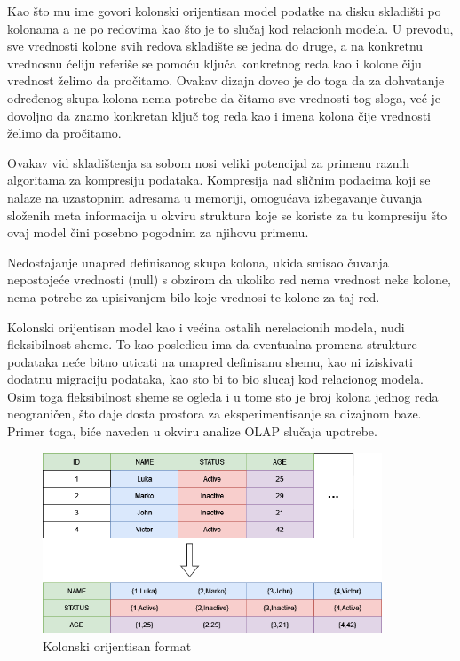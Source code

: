 \documentclass[12pt,oneside]{memoir}
\begin{document}
Kao što mu ime govori kolonski orijentisan model podatke na disku skladišti po kolonama a ne po redovima kao što je to slučaj kod relacionh modela. U prevodu, sve vrednosti kolone svih redova skladište se jedna do druge, a na konkretnu vrednosnu ćeliju referiše se pomoću ključa konkretnog reda kao i kolone čiju vrednost želimo da pročitamo. Ovakav dizajn doveo je do toga da za dohvatanje određenog skupa kolona nema potrebe da čitamo sve vrednosti tog sloga, već je dovoljno da znamo konkretan ključ tog reda kao i imena kolona čije vrednosti želimo da pročitamo.

Ovakav vid skladištenja sa sobom nosi veliki potencijal za primenu raznih algoritama za kompresiju podataka.  Kompresija nad sličnim podacima koji se nalaze na uzastopnim adresama u memoriji, omogućava izbegavanje čuvanja složenih meta informacija u okviru struktura koje se koriste za tu kompresiju što ovaj model čini posebno pogodnim za njihovu primenu.

Nedostajanje unapred definisanog skupa kolona, ukida smisao čuvanja nepostojeće vrednosti (null) s obzirom da ukoliko  red nema vrednost neke kolone, nema potrebe za upisivanjem bilo koje vrednosi te kolone za taj red.

Kolonski orijentisan model kao i većina ostalih nerelacionih modela, nudi fleksibilnost sheme. To kao posledicu ima da eventualna promena strukture podataka neće bitno uticati na unapred definisanu shemu, kao ni iziskivati dodatnu migraciju podataka, kao sto bi to bio slucaj kod relacionog modela. Osim toga fleksibilnost sheme se ogleda i u tome sto je broj kolona jednog reda neograničen, što daje dosta prostora za eksperimentisanje sa dizajnom baze. Primer toga, biće naveden u okviru analize OLAP slučaja upotrebe. 
\begin{figure}[!ht]
  \vspace*{4cm}
  \centering
  \includegraphics[width=0.9\textwidth]{relational-column-oriented.png}
  \caption{Kolonski orijentisan format}
  \label{fig:grafikon}
\end{figure}
\end{document}
